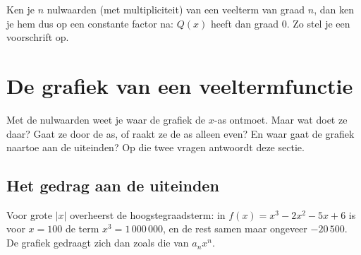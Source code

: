 Ken je $n$ nulwaarden (met multipliciteit) van een veelterm van graad $n$, dan ken je hem dus op een constante factor na: $Q(x)$ heeft dan graad $0$. Zo stel je een voorschrift op.


\begin{oefeningen}
\end{oefeningen}

\section{De grafiek van een veeltermfunctie}

Met de nulwaarden weet je waar de grafiek de $x$-as ontmoet. Maar wat doet ze daar? Gaat ze door de as, of raakt ze de as alleen even? En waar gaat de grafiek naartoe aan de uiteinden? Op die twee vragen antwoordt deze sectie.

\subsection{Het gedrag aan de uiteinden}

Voor grote $|x|$ overheerst de hoogstegraadsterm: in $f(x) = x^3 - 2x^2 - 5x + 6$ is voor $x = 100$ de term $x^3 = 1\,000\,000$, en de rest samen maar ongeveer $-20\,500$. De grafiek gedraagt zich dan zoals die van $a_n x^n$.

